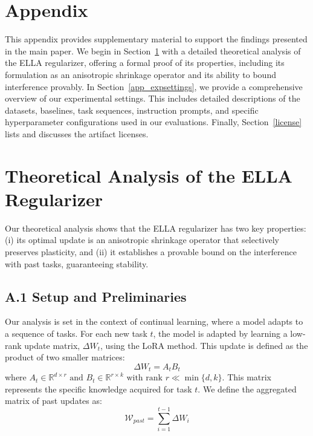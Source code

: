 \appendix
\section*{Appendix}

This appendix provides supplementary material to support the findings presented in the main paper. We begin in Section~\ref{app:proof} with a detailed theoretical analysis of the ELLA regularizer, offering a formal proof of its properties, including its formulation as an anisotropic shrinkage operator and its ability to bound interference provably. In Section~\ref{app_expsettings}, we provide a comprehensive overview of our experimental settings. This includes detailed descriptions of the datasets, baselines, task sequences, instruction prompts, and specific hyperparameter configurations used in our evaluations. Finally, Section~\ref{license} lists and discusses the artifact licenses.
\section{Theoretical Analysis of the
ELLA Regularizer}
\label{app:proof}
Our theoretical analysis shows that the ELLA regularizer has two key properties: (i) its optimal update is an anisotropic shrinkage operator that selectively preserves plasticity, and (ii) it establishes a provable bound on the interference with past tasks, guaranteeing stability.

\subsection*{A.1 Setup and Preliminaries}
Our analysis is set in the context of continual learning, where a model adapts to a sequence of tasks.
For each new task $t$, the model is adapted by learning a low-rank update matrix, $\Delta W_t$, using the LoRA method. This update is defined as the product of two smaller matrices:
\begin{equation}
\Delta W_t = A_t B_t
\end{equation}
where $A_t\in\mathbb{R}^{d \times r} \text{ and }B_t \in \mathbb{R}^{r \times k} \text{ with rank } r \ll \min\{d,k\}$. This matrix represents the specific knowledge acquired for task $t$. We define the aggregated matrix of past updates as:
\begin{equation}
\mathcal{W}_{past} = \sum_{i=1}^{t-1} \Delta W_i
\end{equation}

